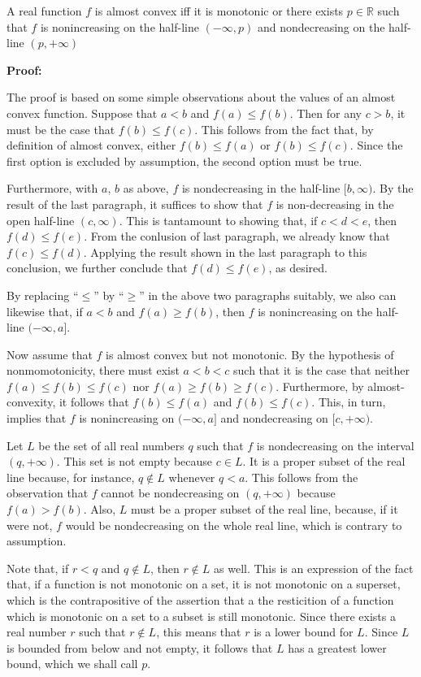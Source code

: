 \documentclass[12pt]{article}
\begin{document}
A real function $f$ is almost convex iff it is monotonic or there exists $p \in \mathbb{R}$ such that $f$ is nonincreasing on the half-line $(-\infty, p)$ and
nondecreasing on the half-line $(p,+\infty)$

{\bf Proof:}

The proof is based on some simple observations about the values of an almost convex function. Suppose that $a < b$ and $f(a) \le f(b)$.  Then for any $c > b$, it must be the case that $f(b) \le f(c)$.  This follows from the fact that, by definition of almost convex, either $f(b) \le f(a)$ or $f(b) \le f(c)$.  Since the first option is excluded by assumption, the second option must be true.

Furthermore, with $a$, $b$ as above, $f$ is nondecreasing in the half-line $[b,\infty)$.  By the result of the last paragraph, it suffices to show that $f$ is non-decreasing in the open half-line $(c,\infty)$.  This is tantamount to showing that, if $c < d < e$, then $f(d) \le f(e)$.  From the conlusion of last paragraph, we already know that $f(c) \le f(d)$.  Applying the result shown in the last paragraph to this conclusion, we further conclude that $f(d) \le f(e)$, as desired.

By replacing ``$\le$'' by ``$\ge$'' in the above two paragraphs suitably, we also can likewise that, if $a < b$ and $f(a) \ge f(b)$, then $f$ is nonincreasing on the half-line $(-\infty,a]$.

Now assume that $f$ is almost convex but not monotonic.  By the hypothesis of nonmomotonicity, there must exist $a < b < c$ such that it is the case that neither $f(a) \le f(b) \le f(c)$ nor $f(a) \ge f(b) \ge f(c)$.  Furthermore, by almost-convexity, it follows that $f(b) \le f(a)$ and $f(b) \le f(c)$.  This, in turn, implies that $f$ is nonincreasing on $(-\infty,a]$ and nondecreasing on $[c,+\infty)$.

Let $L$ be the set of all real numbers $q$ such that $f$ is nondecreasing on the interval $(q,+\infty)$.  This set is not empty because $c \in L$.  It is a proper subset of the real line because, for instance, $q \notin L$ whenever $q < a$. This follows from the observation that $f$ cannot be nondecreasing on $(q,+\infty)$ because $f(a) > f(b)$.  Also, $L$ must be a proper subset of the real line, because, if it were not, $f$ would be nondecreasing on the whole real line, which is contrary to assumption.

Note that, if $r < q$ and $q \notin L$, then $r \notin L$ as well.  This is an expression of the fact that, if a function is not monotonic on a set, it is not monotonic on a superset, which is the contrapositive of the assertion that a the resticition of a function which is monotonic on a set to a subset is still monotonic.  Since there exists a real number $r$ such that $r \notin L$, this means that $r$ is a lower bound for $L$.  Since $L$ is bounded from below and not empty, it follows that $L$ has a greatest lower bound, which we shall call $p$.
\end{document}
